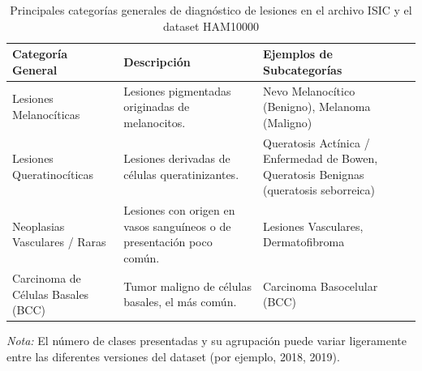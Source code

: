 \begin{table}[ht]
    \centering
    \caption{Principales categorías generales de diagnóstico de lesiones en el archivo ISIC y el dataset HAM10000}
    \label{tab:isic_categorias}
    \begin{tabularx}{\textwidth}{|>{\raggedright\arraybackslash}X|>{\raggedright\arraybackslash}X|>{\raggedright\arraybackslash}X|}
        \hline
        \textbf{Categoría General} & \textbf{Descripción} & \textbf{Ejemplos de Subcategorías} \\
        \hline
        Lesiones Melanocíticas & Lesiones pigmentadas originadas de melanocitos. & Nevo Melanocítico (Benigno), Melanoma (Maligno) \\
        \hline
        Lesiones Queratinocíticas & Lesiones derivadas de células queratinizantes. & Queratosis Actínica / Enfermedad de Bowen, Queratosis Benignas (queratosis seborreica) \\
        \hline
        Neoplasias Vasculares / Raras & Lesiones con origen en vasos sanguíneos o de presentación poco común. & Lesiones Vasculares, Dermatofibroma \\
        \hline
        Carcinoma de Células Basales (BCC) & Tumor maligno de células basales, el más común. & Carcinoma Basocelular (BCC) \\
        \hline
    \end{tabularx}
    \small{\textit{Nota:} El número de clases presentadas y su agrupación puede variar ligeramente entre las diferentes versiones del dataset (por ejemplo, 2018, 2019).}
\end{table}

